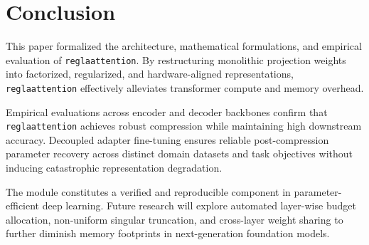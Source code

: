 \section{Conclusion}
This paper formalized the architecture, mathematical formulations, and empirical evaluation of \texttt{reglaattention}. By restructuring monolithic projection weights into factorized, regularized, and hardware-aligned representations, \texttt{reglaattention} effectively alleviates transformer compute and memory overhead.

Empirical evaluations across encoder and decoder backbones confirm that \texttt{reglaattention} achieves robust compression while maintaining high downstream accuracy. Decoupled adapter fine-tuning ensures reliable post-compression parameter recovery across distinct domain datasets and task objectives without inducing catastrophic representation degradation.

The module constitutes a verified and reproducible component in parameter-efficient deep learning. Future research will explore automated layer-wise budget allocation, non-uniform singular truncation, and cross-layer weight sharing to further diminish memory footprints in next-generation foundation models.
